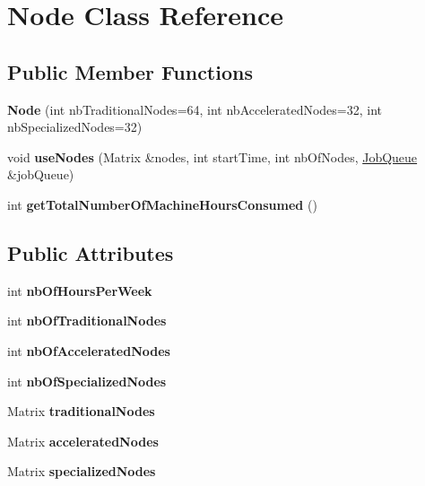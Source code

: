 \hypertarget{class_node}{}\section{Node Class Reference}
\label{class_node}
\subsection*{Public Member Functions}
\begin{DoxyCompactItemize}
\item 
\mbox{\label{class_node_a9b392d27de54c97ef230c6f96975ec86}} 
{\bfseries Node} (int nb\+Traditional\+Nodes=64, int nb\+Accelerated\+Nodes=32, int nb\+Specialized\+Nodes=32)
\item 
\mbox{\label{class_node_a8ea7618f3d3c911f41befaf771c94c55}} 
void {\bfseries use\+Nodes} (Matrix \&nodes, int start\+Time, int nb\+Of\+Nodes, \mbox{\hyperlink{class_job_queue}{Job\+Queue}} \&job\+Queue)
\item 
\mbox{\label{class_node_a429132bde9ec23913d9dfab4ffd23971}} 
int {\bfseries get\+Total\+Number\+Of\+Machine\+Hours\+Consumed} ()
\end{DoxyCompactItemize}
\subsection*{Public Attributes}
\begin{DoxyCompactItemize}
\item 
\mbox{\label{class_node_ab3c28d4dffc8911009b7af4b079ce99f}} 
int {\bfseries nb\+Of\+Hours\+Per\+Week}
\item 
\mbox{\label{class_node_a6bb2fba37331b31a5b57cba59ed34406}} 
int {\bfseries nb\+Of\+Traditional\+Nodes}
\item 
\mbox{\label{class_node_a7065d23d72c9395a4c04462d70885c1b}} 
int {\bfseries nb\+Of\+Accelerated\+Nodes}
\item 
\mbox{\label{class_node_afb2cc27b3b3385f9d0bbc4f21a330841}} 
int {\bfseries nb\+Of\+Specialized\+Nodes}
\item 
\mbox{\label{class_node_adeb696381aeabb3622f46ee44d0f5418}} 
Matrix {\bfseries traditional\+Nodes}
\item 
\mbox{\label{class_node_acfc5a971c0d55eebd3b9b487936263c6}} 
Matrix {\bfseries accelerated\+Nodes}
\item 
\mbox{\label{class_node_ae46791f9ae6fbbaa5f16e4d6380b200d}} 
Matrix {\bfseries specialized\+Nodes}
\end{DoxyCompactItemize}


